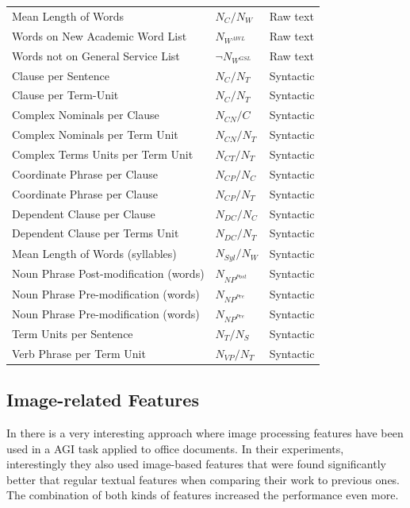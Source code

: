 \begin{table}[t]
\begin{tabular}{lll}
		Mean Length of Words & $N_{C}/N_{W}$ & Raw text \\
		Words on New Academic Word List & ${N_{W^{AWL}}}$ & Raw text \\
		Words not on General Service List & $\neg{N_{W^{GSL}}}$ & Raw text \\
		Clause per Sentence & $N_{C}/N_{T}$ & Syntactic \\
		Clause per Term-Unit & $N_{C}/N_{T}$ & Syntactic \\
		Complex Nominals per Clause & $N_{CN}/C$ & Syntactic \\
		Complex Nominals per Term Unit & $N_{CN}/N_{T}$ & Syntactic \\
		Complex Terms Units per Term Unit & $N_{CT}/N_{T}$ & Syntactic \\
		Coordinate Phrase per Clause & $N_{CP}/N_{C}$ & Syntactic \\
		Coordinate Phrase per Clause & $N_{CP}/N_{T}$ & Syntactic \\
		Dependent Clause per Clause & $N_{DC}/N_{C}$ & Syntactic \\
		Dependent Clause per Terms Unit & $N_{DC}/N_{T}$ & Syntactic \\
		Mean Length of Words (syllables) & $N_{Syl}/N_{W}$ & Syntactic \\
		Noun Phrase Post-modification (words) & $N_{NP^{Post}}$ & Syntactic \\
		Noun Phrase Pre-modification (words) & $N_{NP^{Pre}}$ & Syntactic \\
		Noun Phrase Pre-modification (words) & $N_{NP^{Pre}}$ & Syntactic \\
		Term Units per Sentence & $N_{T}/N_{S}$ & Syntactic \\
		Verb Phrase per Term Unit &  $N_{VP}/N_{T}$ & Syntactic \\
		\hline
	\end{tabular}
\end{table}

\subsection{Image-related Features} 

In \parencite{chen2012genre} there is a very interesting approach where image processing features have been used in a AGI task applied to office documents. In their experiments, interestingly they also used image-based features that were found significantly better that regular textual features when comparing their work to previous ones. The combination of both kinds of features increased the performance even more.

